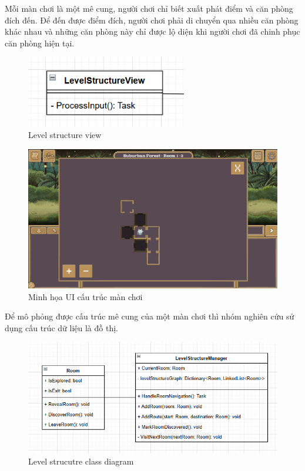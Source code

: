Mỗi màn chơi là một mê cung, người chơi chỉ biết xuất phát điểm và căn phòng đích đến. Để đến được điểm đích, người chơi phải di chuyển qua nhiều căn phòng khác nhau và những căn phòng này chỉ được lộ diện khi người chơi đã chinh phục căn phòng hiện tại.

\begin{figure}[H]
	\centering
	\includegraphics[width=7cm]{Images/LevelStructureView.png}
	\vspace{0.5cm}
	\caption{Level structure view}
\end{figure}

\begin{figure}[H]
	\centering
	\includegraphics[width=13cm]{Images/LevelStructureUI.png}
	\vspace{0.5cm}
	\caption{Minh họa UI cấu trúc màn chơi}
\end{figure}

Để mô phỏng được cấu trúc mê cung của một màn chơi thì nhóm nghiên cứu sử dụng cấu trúc dữ liệu là đồ thị.

\begin{figure}[H]
	\centering
	\includegraphics[width=13cm]{Images/LevelStructureManager.png}
	\vspace{0.5cm}
	\caption{Level strucutre class diagram}
\end{figure}